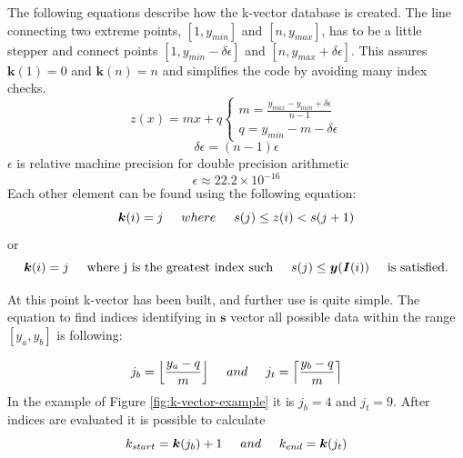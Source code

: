 \documentclass[12pt,a4paper,twoside]{article}
\begin{document}
The following equations describe how the k-vector database is created. The line connecting two extreme points, $[1, y_{min}]$ and $[n, y_{max}]$, has to be a little stepper and connect points $[1, y_{min}-\delta\epsilon]$ and $[n, y_{max}+\delta\epsilon]$. This assures $\bm{k}(1) = 0$ and $\bm{k}(n	) = n$ and simplifies the code by avoiding many index checks.
\begin{equation}
z(x) = mx + q \begin{cases}m = \frac{y_{max} - y_{min} + \delta\epsilon}{n - 1} \\
q = y_{min} - m - \delta\epsilon \end{cases}
\end{equation}
\begin{equation}
\delta\epsilon = (n - 1)\epsilon
\end{equation}
$\epsilon$ is relative machine precision for double precision arithmetic
\begin{equation}
\epsilon \approx 22.2 \times 10^{-16}
\end{equation}
Each other element can be found using the following equation:
\begin{equation}
\bm{k}(i) = j \hspace{0.5cm} where \hspace{0.5cm} s(j) \leq z(i) < s(j + 1)
\end{equation}
or
\begin{equation}
\bm{k}(i) = j \hspace{0.5cm} \textnormal{where j is the greatest index such} \hspace{0.5cm} s(j) \leq \bm{y}	(\bm{I}(i)) \hspace{0.5cm} \textnormal{is satisfied.}
\end{equation}

At this point k-vector has been built, and further use is quite simple. The equation to find indices identifying in $\bm{s}$ vector all possible data within the range $[y_a, y_b ]$ is following:

\begin{equation}
j_b = \Big\lfloor\frac{y_a - q}{m}\Big\rfloor \hspace{0.5cm} and \hspace{0.5cm} j_t = \Big\lceil\frac{y_b - q}{m}\Big\rceil
\end{equation}
In the example of Figure \ref{fig:k-vector-example} it is $j_b = 4$ and $j_t = 9$. After indices are evaluated it is possible to calculate
\begin{equation}
k_{start} = \bm{k}(j_b) + 1 \hspace{0.5cm} and \hspace{0.5cm} k_{end} = \bm{k}(j_t)
\end{equation}
\end{document}

